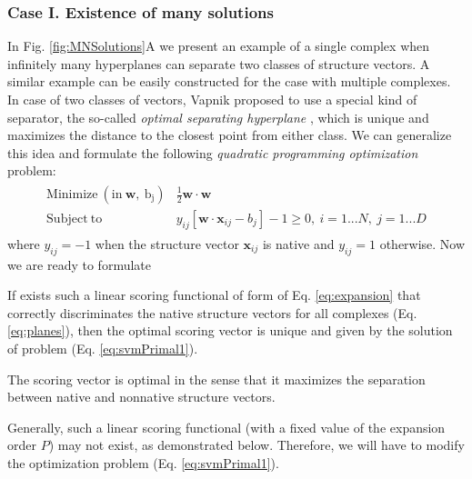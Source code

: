 \subsubsection{Case I. Existence of many solutions}
In Fig. \ref{fig:MNSolutions}A we present an example of a single complex when infinitely many hyperplanes can separate  
 two classes of structure vectors. 
 A similar example can be easily constructed for the case with multiple complexes. 
 In case of two classes of vectors, Vapnik proposed to use a special kind of separator, the so-called \emph{optimal separating hyperplane} \cite{Vapnik2000}, 
 which is unique and maximizes the distance to the closest point from either class. 
 We can generalize this idea and formulate the following \emph{quadratic 
programming optimization} problem:
 \begin{eqnarray}
 \begin{array}{lcl} 
\mathrm{Minimize ~(in  ~\mathbf{w}, ~b_j)} &  \frac{1}{2} \mathbf{w} \cdot \mathbf{w}\\
\label{eq:svmPrimal1}
\mathrm{Subject~to}& y_{ij} \left[ \mathbf{w} \cdot \mathbf{x}_{ij}-b_j \right]-1 \geq 0, ~ i=1...N,~j=1...D
\end{array}
\end{eqnarray}
where $y_{ij} = -1$ when the structure vector $\mathbf{x}_{ij}$ is native and $y_{ij} = 1$ otherwise.
Now we are ready to formulate
%
\begin{lemma}
If exists such a linear scoring functional of form of Eq. \ref{eq:expansion} that correctly discriminates the native structure vectors for all 
complexes (Eq. \ref{eq:planes}), then the optimal scoring vector is unique and given by the solution of problem (Eq. \ref{eq:svmPrimal1}).
\end{lemma}
%
\begin{remark}
The scoring vector is optimal in the sense that it maximizes the separation between native and nonnative structure vectors.
\end{remark}
Generally, such a linear scoring functional (with a fixed value of the expansion order $P$) may not exist, as demonstrated below. 
Therefore, we will have to modify the optimization problem (Eq. \ref{eq:svmPrimal1}). 

